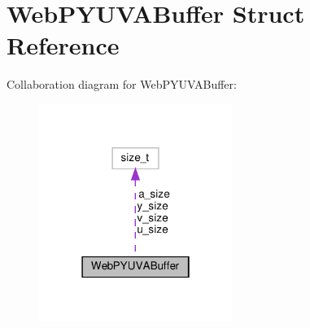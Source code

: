 \hypertarget{structWebPYUVABuffer}{}\section{Web\+P\+Y\+U\+V\+A\+Buffer Struct Reference}
\label{structWebPYUVABuffer}


Collaboration diagram for Web\+P\+Y\+U\+V\+A\+Buffer\+:
\nopagebreak
\begin{figure}[H]
\begin{center}
\leavevmode
\includegraphics[width=178pt]{structWebPYUVABuffer__coll__graph}
\end{center}
\end{figure}
